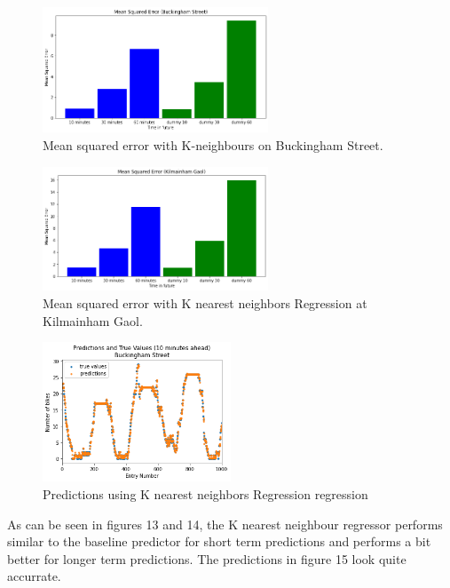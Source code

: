 \begin{figure}[H]
    \centering
    \includegraphics[width=0.6\textwidth]{images/mse3.png}
    \caption{Mean squared error with K-neighbours on Buckingham Street.}
    \end{figure}
\par
\begin{figure}[H]
    \centering
    \includegraphics[width=0.6\textwidth]{images/mse4.png}
    \caption{Mean squared error with K nearest neighbors Regression at Kilmainham Gaol.}
    \end{figure}
\par
\begin{figure}[H]
    \centering
    \includegraphics[width=0.5\textwidth]{images/preds7.png}
    \caption{Predictions using K nearest neighbors Regression regression}
    \end{figure}
\par

As can be seen in figures 13 and 14, the K nearest neighbour regressor performs similar to the baseline predictor for short term predictions and performs a bit better for longer term predictions.
The predictions in figure 15 look quite accurrate.


